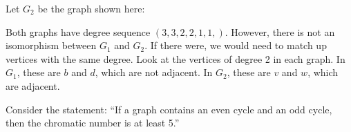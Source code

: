 \documentclass[11pt]{exam}
\def\imp{\rightarrow}
\begin{document}
\begin{questions}
\begin{parts}
\begin{solution}

Let $G_2$ be the graph shown here:


Both graphs have degree sequence $(3,3,2,2,1,1,)$.  However, there is not an isomorphism between $G_1$ and $G_2$.  If there were, we would need to match up vertices with the same degree.  Look at the vertices of degree 2 in each graph.  In $G_1$, these are $b$ and $d$, which are not adjacent.  In $G_2$, these are $v$ and $w$, which are adjacent.
	\end{solution}


	\vfill


\end{parts}



\newpage

\question Consider the statement: ``If a graph contains an even cycle and an odd cycle, then the chromatic number is at least 5.''
\end{questions}
\end{document}

